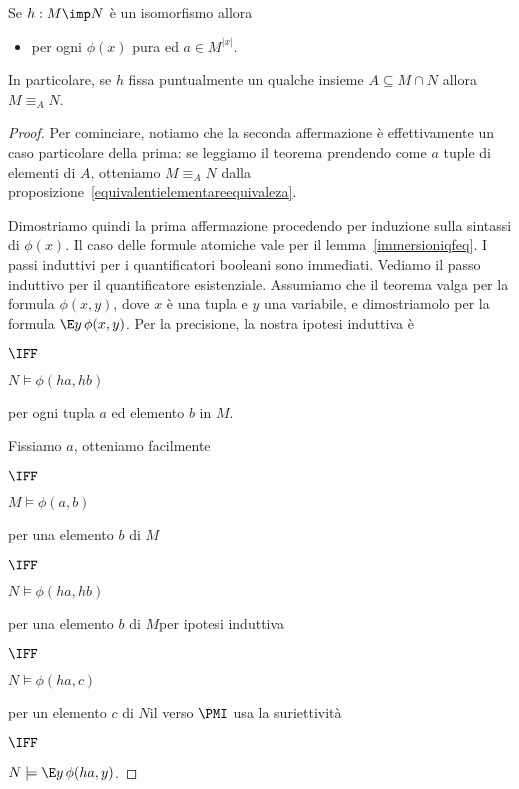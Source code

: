 \begin{theorem}\label{isomorfoeleq}
Se $h:M\imp N$ \`e un isomorfismo allora 
\begin{itemize}
\item[] per ogni $\phi(x)$ pura ed $a\in M^{|x|}$.
\end{itemize}
In particolare, se $h$ fissa puntualmente un qualche insieme $A\subseteq M\cap N$ allora $M\equiv_A N$.
\end{theorem}

\begin{proof}
Per cominciare, notiamo che la seconda affermazione \`e effettivamente un caso particolare della prima: se leggiamo il teorema prendendo come $a$ tuple di elementi di $A$, otteniamo $M\equiv_A N$ dalla proposizione~\ref{equivalentielementareequivaleza}.

Dimostriamo quindi la prima affermazione procedendo per induzione sulla sintassi di $\phi(x)$. Il caso delle formule atomiche vale per il lemma~\ref{immersioniqfeq}. I passi induttivi per i quantificatori booleani sono immediati. Vediamo il passo induttivo per il quantificatore esistenziale. Assumiamo che il teorema valga per la formula $\phi(x,y)$, dove $x$ \`e una tupla e $y$ una variabile, e dimostriamolo per la formula $\E y\,\phi(x,y)$. Per la precisione, la nostra ipotesi induttiva \`e 

\hspace*{18ex}\parbox{7ex}{\hfil$\IFF$}\parbox{15ex}{$N\models \phi(ha,hb)$} per ogni tupla $a$ ed elemento $b$ in $M$.

Fissiamo $a$, otteniamo facilmente

\hspace*{18ex}\parbox{7ex}{\hfil$\IFF$}\parbox{14ex}{$M\models\phi(a,b)$} per una elemento $b$ di $M$

\hspace*{18ex}\parbox{7ex}{\hfil$\IFF$}\parbox{14ex}{$N\models\phi(ha,hb)$} per una elemento $b$ di $M$\hfill per ipotesi induttiva

\hspace*{18ex}\parbox{7ex}{\hfil$\IFF$}\parbox{14ex}{$N\models\phi(ha,c)$} per un elemento $c$ di $N$\hfill il verso $\PMI$ usa la suriettivit\`a

\hspace*{18ex}\parbox{7ex}{\hfil$\IFF$}$N\models\E y\,\phi(ha,y)$.
\end{proof}


